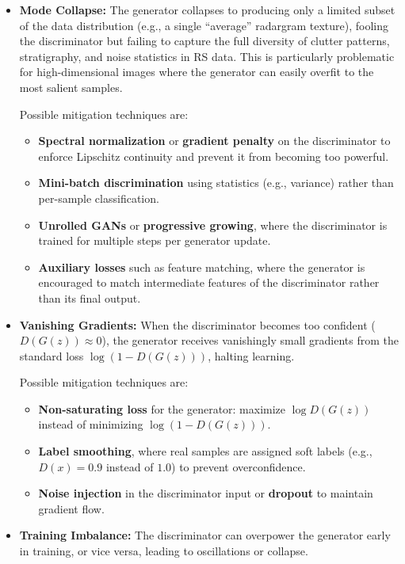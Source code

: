 \begin{itemize}
    \item \textbf{Mode Collapse:} The generator collapses to producing only a limited subset of the data distribution (e.g., a single \enquote{average} radargram texture), fooling the discriminator but failing to capture the full diversity of clutter patterns, stratigraphy, and noise statistics in RS data. This is particularly problematic for high-dimensional images where the generator can easily overfit to the most salient samples.

    Possible mitigation techniques are:
    \begin{itemize}
        \item \textbf{Spectral normalization} or \textbf{gradient penalty} on the discriminator to enforce Lipschitz continuity and prevent it from becoming too powerful.
        \item \textbf{Mini-batch discrimination} using statistics (e.g., variance) rather than per-sample classification.
        \item \textbf{Unrolled GANs} or \textbf{progressive growing}, where the discriminator is trained for multiple steps per generator update.
        \item \textbf{Auxiliary losses} such as feature matching, where the generator is encouraged to match intermediate features of the discriminator rather than its final output.
    \end{itemize}

    \item \textbf{Vanishing Gradients:} When the discriminator becomes too confident ($D(G(z)) \approx 0$), the generator receives vanishingly small gradients from the standard loss $\log(1 - D(G(z)))$, halting learning.

    Possible mitigation techniques are:
    \begin{itemize}
        \item \textbf{Non-saturating loss} for the generator: maximize $\log D(G(z))$ instead of minimizing $\log(1 - D(G(z)))$.
        \item \textbf{Label smoothing}, where real samples are assigned soft labels (e.g., $D(x) = 0.9$ instead of $1.0$) to prevent overconfidence.
        \item \textbf{Noise injection} in the discriminator input or \textbf{dropout} to maintain gradient flow.
    \end{itemize}

    \item \textbf{Training Imbalance:} The discriminator can overpower the generator early in training, or vice versa, leading to oscillations or collapse.


\end{itemize}

